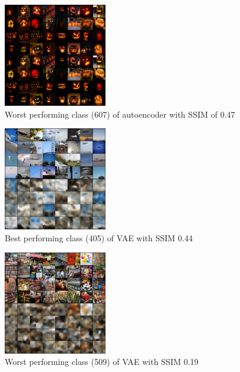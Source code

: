 \begin{figure}
    \centering
    \includegraphics[width=0.4\textwidth]{../../sample_images/evaluation/MIN_AE_IDX_607}
    \caption{Worst performing class (607) of autoencoder with SSIM of 0.47}
    \label{fig:imnet_worst_perf_ae}
\end{figure}

\begin{figure}
    \centering
    \includegraphics[width=0.4\textwidth]{../../sample_images/evaluation/MAX_VAE_IDX_405}
    \caption{Best performing class (405) of VAE with SSIM 0.44}
    \label{fig:imnet_best_perf2_vae}
\end{figure}

\begin{figure}
    \centering
    \includegraphics[width=0.4\textwidth]{../../sample_images/evaluation/MIN_VAE_IDX_509}
    \caption{Worst performing class (509) of VAE with SSIM 0.19}
    \label{fig:imnet_worst_perf2_vae}
\end{figure}

